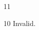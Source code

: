 \documentclass[paper=A4]{ropas-poster}
\begin{document}
\begin{postergrid}{1}{1}
\begin{posterblock}{1}{0}
Invalid.
\end{posterblock}
\end{postergrid}
\end{document}
